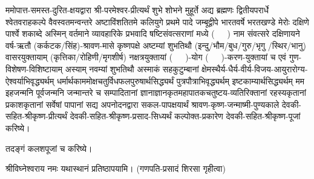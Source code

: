 ममोपात्त-समस्त-दुरित-क्षयद्वारा श्री-परमेश्वर-प्रीत्यर्थं शुभे शोभने मुहूर्ते अद्य ब्रह्मणः
द्वितीयपरार्धे श्वेतवराहकल्पे वैवस्वतमन्वन्तरे अष्टाविंशतितमे कलियुगे प्रथमे पादे
जम्बूद्वीपे भारतवर्षे भरतखण्डे मेरोः दक्षिणे पार्श्वे शकाब्दे अस्मिन् वर्तमाने व्यावहारिके
प्रभवादि षष्टिसंवत्सराणां मध्ये \mbox{(~~~)} नाम संवत्सरे दक्षिणायने वर्ष-ऋतौ  (कर्कटक/सिंह)-श्रावण-मासे 
कृष्णपक्षे अष्टम्यां शुभतिथौ (इन्दु/भौम/बुध/गुरु/भृगु /स्थिर/भानु) वासरयुक्तायाम्
(कृत्तिका/रोहिणी/मृगशीर्ष) नक्षत्रयुक्तायां (~~~)-योग (~~~)-करण-युक्तायां च एवं गुण-विशेषण-विशिष्टायाम्
अस्याम् नवम्यां शुभतिथौ अस्माकं सहकुटुम्बानां क्षेमस्थैर्य-धैर्य-वीर्य-विजय-आयुरारोग्य-ऐश्वर्याभिवृद्ध्यर्थम्
धर्मार्थकाममोक्ष\-चतुर्विधफलपुरुषार्थसिद्ध्यर्थं पुत्रपौत्राभिवृद्ध्यर्थम् इष्टकाम्यार्थसिद्ध्यर्थम्
मम इहजन्मनि पूर्वजन्मनि जन्मान्तरे च सम्पादितानां ज्ञानाज्ञानकृतमहा\-पातकचतुष्टय-व्यतिरिक्तानां रहस्यकृतानां प्रकाशकृतानां सर्वेषां पापानां सद्य अपनोदनद्वारा सकल-पापक्षयार्थं 
श्रावण-कृष्ण-जन्माष्मी-पुण्यकाले देवकी-सहित-श्रीकृष्ण-प्रीत्यर्थं देवकी-सहित-श्रीकृष्ण-प्रसाद-सिध्यर्थं कल्पोक्त-प्रकारेण देवकी-सहित-श्रीकृष्ण-पूजां करिष्ये।

तदङ्गं कलशपूजां च करिष्ये।


श्रीविघ्नेश्वराय नमः यथास्थानं प्रतिष्ठापयामि।
(गणपति-प्रसादं शिरसा गृहीत्वा)














